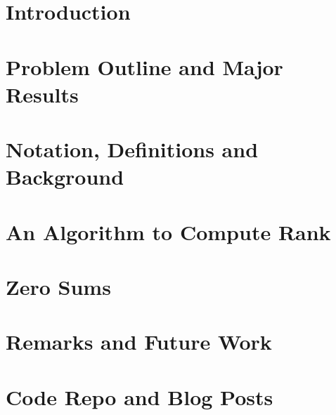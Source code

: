 \documentclass [11pt, proquest] {thesis}[2015/03/03]
\begin{document}
%
 
%
%
\textpages
 
\chapter{Introduction}

 
\chapter{Problem Outline and Major Results}\label{sec:outline_results}

 
\chapter{Notation, Definitions and Background}\label{sec:defs_background}


\chapter{An Algorithm to Compute Rank}\label{chap:main_theorem}


\chapter{Zero Sums}


\chapter{Remarks and Future Work}



\printendnotes

%
%
\nocite{*}   %


%
%
\appendix
\raggedbottom\sloppy
 
 
\chapter{Code Repo and Blog Posts}
 
\end{document}

